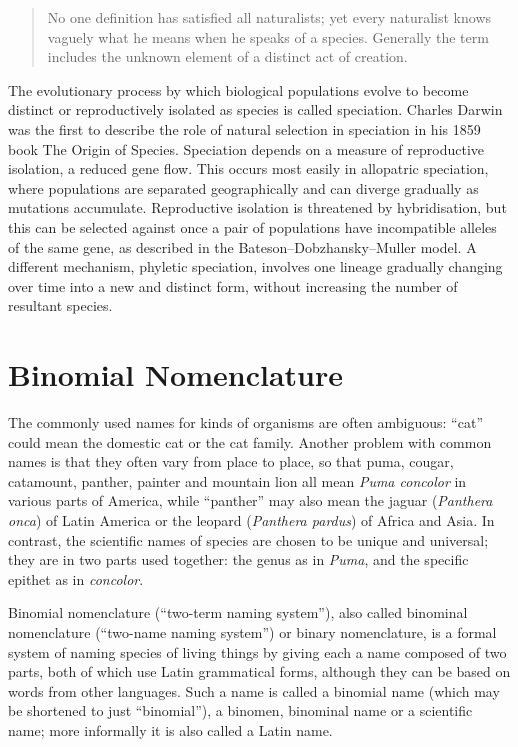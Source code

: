\begin{quote}
No one definition has satisfied all naturalists; yet every naturalist knows vaguely what he means when he speaks of a species. Generally the term includes the unknown element of a distinct act of creation.
\end{quote}

The evolutionary process by which biological populations evolve to become distinct or reproductively isolated as species is called speciation. Charles Darwin was the first to describe the role of natural selection in speciation in his 1859 book The Origin of Species. Speciation depends on a measure of reproductive isolation, a reduced gene flow. This occurs most easily in allopatric speciation, where populations are separated geographically and can diverge gradually as mutations accumulate. Reproductive isolation is threatened by hybridisation, but this can be selected against once a pair of populations have incompatible alleles of the same gene, as described in the Bateson--Dobzhansky--Muller model. A different mechanism, phyletic speciation, involves one lineage gradually changing over time into a new and distinct form, without increasing the number of resultant species.

\hypertarget{binomial-nomenclature}{%
\section{Binomial Nomenclature}\label{binomial-nomenclature}}

The commonly used names for kinds of organisms are often ambiguous: ``cat'' could mean the domestic cat or the cat family. Another problem with common names is that they often vary from place to place, so that puma, cougar, catamount, panther, painter and mountain lion all mean \emph{Puma concolor} in various parts of America, while ``panther'' may also mean the jaguar (\emph{Panthera onca}) of Latin America or the leopard (\emph{Panthera pardus}) of Africa and Asia. In contrast, the scientific names of species are chosen to be unique and universal; they are in two parts used together: the genus as in \emph{Puma}, and the specific epithet as in \emph{concolor}.

Binomial nomenclature (``two-term naming system''), also called binominal nomenclature (``two-name naming system'') or binary nomenclature, is a formal system of naming species of living things by giving each a name composed of two parts, both of which use Latin grammatical forms, although they can be based on words from other languages. Such a name is called a binomial name (which may be shortened to just ``binomial''), a binomen, binominal name or a scientific name; more informally it is also called a Latin name.

